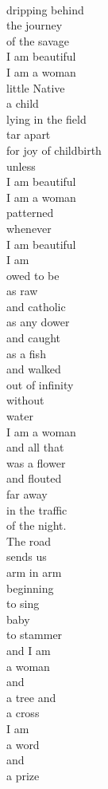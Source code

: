 \documentclass[smalldemyvopaper,11pt,twoside,onecolumn,openright,extrafontsizes]{memoir}
\begin{document}
\\dripping behind
\\the journey
\\of the savage
\\I am beautiful
\\I am a woman
\\little Native
\\a child
\\lying in the field
\\tar apart
\\for joy of childbirth
\\unless
\\I am beautiful
\\I am a woman
\\patterned
\\whenever
\\I am beautiful
\\I am
\\owed to be
\\as raw
\\and catholic
\\as any dower
\\and caught
\\as a fish
\\and walked
\\out of infinity
\\without
\\water
\\I am a woman
\\and all that
\\was a flower
\\and flouted
\\far away
\\in the traffic
\\of the night.
\\The road
\\sends us
\\arm in arm
\\beginning
\\to sing
\\baby
\\to stammer
\\and I am
\\a woman
\\and
\\a tree and
\\a cross
\\I am
\\a word
\\and
\\a prize
\end{document}
